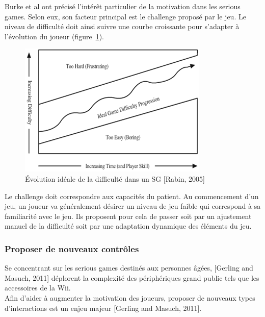 Burke et al\cite{Burk09} ont précisé l'intérêt particulier de la motivation dans les serious games. Selon eux, son facteur principal est le challenge proposé par le jeu. Le niveau de difficulté doit ainsi suivre une courbe croissante pour s'adapter à l'évolution du joueur (figure~\ref{courbe_difficulte}).
\begin{figure}
	\centering
	\includegraphics[scale=1]{images/courbe_difficulte.png}
	\caption{Évolution idéale de la difficulté dans un SG [Rabin, 2005]}
	\label{courbe_difficulte}
\end{figure}

Le challenge doit correspondre aux capacités du patient. Au commencement d'un jeu, un joueur va généralement désirer un niveau de jeu faible qui correspond à sa familiarité avec le jeu. Ils proposent pour cela de passer soit par un ajustement manuel de la difficulté soit par une adaptation dynamique des éléments du jeu.

	\subsubsection*{Proposer de nouveaux contrôles}
Se concentrant sur les serious games destinés aux personnes âgées, [Gerling and Masuch, 2011]\cite{Gerl11} déplorent la complexité des périphériques grand public tels que les accessoires de la Wii. \\
Afin d'aider à augmenter la motivation des joueurs, proposer de nouveaux types d'interactions est un enjeu majeur [Gerling and Masuch, 2011].

